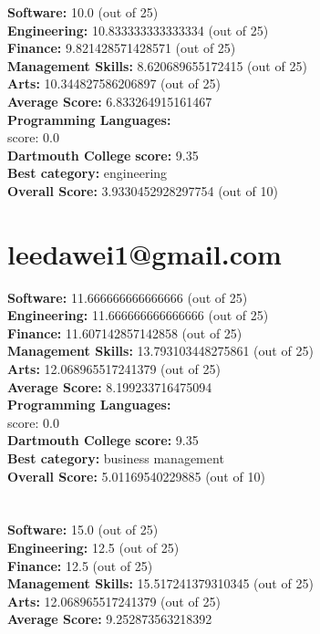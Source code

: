 \documentclass{article}
\begin{document}
\textbf{Software:} 10.0 (out of 25)\\
\textbf{Engineering: } 10.833333333333334 (out of 25)\\
\textbf{Finance:} 9.821428571428571 (out of 25)\\
\textbf{Management Skills:} 8.620689655172415 (out of 25)\\
\textbf{Arts:} 10.344827586206897 (out of 25)\\
\textbf{Average Score: } 6.833264915161467\\
\textbf{Programming Languages:} \\
score: 0.0\\
\textbf{Dartmouth College} \textbf{score:} 9.35\\
\textbf{Best category: } engineering\\
\textbf{Overall Score: }3.9330452928297754 (out of 10)\section{leedawei1@gmail.com}
\textbf{Software:} 11.666666666666666 (out of 25)\\
\textbf{Engineering: } 11.666666666666666 (out of 25)\\
\textbf{Finance:} 11.607142857142858 (out of 25)\\
\textbf{Management Skills:} 13.793103448275861 (out of 25)\\
\textbf{Arts:} 12.068965517241379 (out of 25)\\
\textbf{Average Score: } 8.199233716475094\\
\textbf{Programming Languages:} \\
score: 0.0\\
\textbf{Dartmouth College} \textbf{score:} 9.35\\
\textbf{Best category: } business management\\
\textbf{Overall Score: }5.01169540229885 (out of 10)\section{}
\textbf{Software:} 15.0 (out of 25)\\
\textbf{Engineering: } 12.5 (out of 25)\\
\textbf{Finance:} 12.5 (out of 25)\\
\textbf{Management Skills:} 15.517241379310345 (out of 25)\\
\textbf{Arts:} 12.068965517241379 (out of 25)\\
\textbf{Average Score: } 9.252873563218392\\
\end{document}
